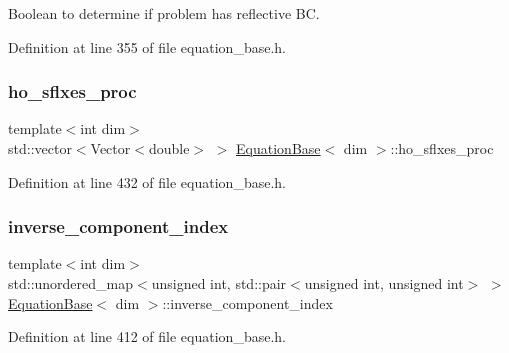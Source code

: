 Boolean to determine if problem has reflective BC. 



Definition at line 355 of file equation\+\_\+base.\+h.

\mbox{\label{class_equation_base_a25123cf5f335e267799a52420396a276}} 
\subsubsection{\texorpdfstring{ho\+\_\+sflxes\+\_\+proc}{ho\_sflxes\_proc}}
{\footnotesize\ttfamily template$<$int dim$>$ \\
std\+::vector$<$Vector$<$double$>$ $>$ \hyperlink{class_equation_base}{Equation\+Base}$<$ dim $>$\+::ho\+\_\+sflxes\+\_\+proc\hspace{0.3cm}{\ttfamily [private]}}



Definition at line 432 of file equation\+\_\+base.\+h.

\mbox{\label{class_equation_base_a1d2e520638913dfeb4e16f3a09911836}} 
\subsubsection{\texorpdfstring{inverse\+\_\+component\+\_\+index}{inverse\_component\_index}}
{\footnotesize\ttfamily template$<$int dim$>$ \\
std\+::unordered\+\_\+map$<$unsigned int, std\+::pair$<$unsigned int, unsigned int$>$ $>$ \hyperlink{class_equation_base}{Equation\+Base}$<$ dim $>$\+::inverse\+\_\+component\+\_\+index\hspace{0.3cm}{\ttfamily [protected]}}



Definition at line 412 of file equation\+\_\+base.\+h.

\mbox{\label{class_equation_base_a749f717dadd0df287fd0c366a7a8e0c1}} 
